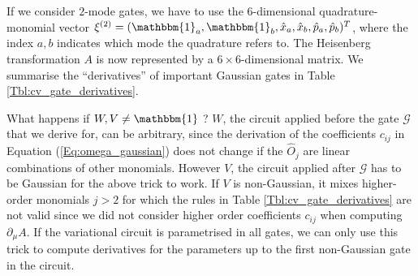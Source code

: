 \documentclass[aps,pra,10pt,twocolumn,groupedaddress,nofootinbib]{revtex4-1}
\theoremstyle{plain}
\newcommand{\x}{\hat{x}}
\newcommand{\p}{\hat{p}}
\newcommand{\G}{\mathcal{G}}
\begin{document}
If we consider $2$-mode gates, we have to use the $6$-dimensional quadrature-monomial vector $\xi^{(2)} =(\mathbbm{1}_a, \mathbbm{1}_b, \x_a, \x_b, \p_a, \p_b )^T$, where the index $a, b$ indicates which mode the quadrature refers to. The Heisenberg transformation $A$ is now represented by a $6 \times 6$-dimensional matrix. We summarise the ``derivatives'' of important Gaussian gates in Table \ref{Tbl:cv_gate_derivatives}.

What happens if $W, V \neq \mathbbm{1}$ ? $W$, the circuit applied before the gate $\G$ that we derive for, can be arbitrary, since the derivation of the coefficients $c_{ij}$ in Equation (\ref{Eq:omega_gaussian}) does not change if the $\hat{O}_j$ are linear combinations of other monomials. However $V$, the circuit applied after $\G$ has to be Gaussian for the above trick to work. If $V$ is non-Gaussian, it mixes higher-order monomials $j>2$ for which the rules in Table \ref{Tbl:cv_gate_derivatives} are not valid since we did not consider higher order coefficients $c_{ij}$ when computing $\partial_{\mu}A$. If the variational circuit is parametrised in all gates, we can only use this trick to compute derivatives for the parameters up to the first non-Gaussian gate in the circuit. \\
\end{document}
